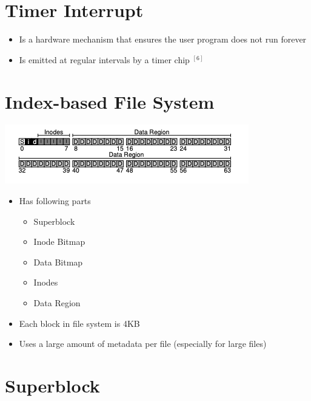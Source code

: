 \documentclass[12pt]{article}
\begin{document}
\section*{Timer Interrupt}

\begin{itemize}
    \item Is a hardware mechanism that ensures the user program does not run forever
    \item Is emitted at regular intervals by a timer chip $^{[6]}$
\end{itemize}


\section*{Index-based File System}

\begin{center}

\includegraphics[width=\linewidth]{images/midterm_1_solution_8.png}
\end{center}

\begin{itemize}
    \item Has following parts

    \begin{itemize}
        \item Superblock
        \item Inode Bitmap
        \item Data Bitmap
        \item Inodes
        \item Data Region
    \end{itemize}

    \item Each block in file system is 4KB
    \item Uses a large amount of metadata per file (especially for large files)
\end{itemize}

\section*{Superblock}
\end{document}
